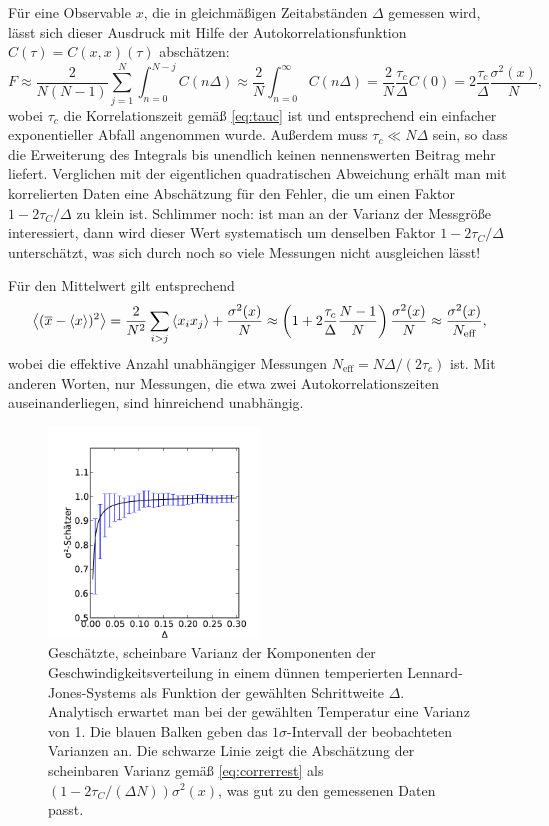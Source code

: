 Für eine Observable $x$, die in gleichmäßigen Zeitabständen $\Delta$
gemessen wird, lässt sich dieser Ausdruck mit Hilfe der
Autokorrelationsfunktion $C(\tau) = C(x,x)(\tau)$ abschätzen:
\begin{equation}
  \label{eq:correrrest}
  F
  \approx
  \frac{2}{N(N-1)}\sum_{j=1}^{N}\int_{n = 0}^{N-j} C(n\Delta)
  \approx
  \frac{2}{N}\int_{n = 0}^{\infty} C(n\Delta)
  =
  \frac{2}{N}\frac{\tau_c}{\Delta} C(0)
  =
  2\frac{\tau_c}{\Delta}\frac{\sigma^2(x)}{N},
\end{equation}
wobei $\tau_c$ die Korrelationszeit gemäß \eqref{eq:tauc} ist und
entsprechend ein einfacher exponentieller Abfall angenommen
wurde. Außerdem muss $\tau_c\ll N\Delta$ sein, so dass die Erweiterung
des Integrals bis unendlich keinen nennenswerten Beitrag mehr liefert.
Verglichen mit der eigentlichen quadratischen Abweichung erhält man
mit korrelierten Daten eine Abschätzung für den Fehler, die um einen
Faktor $1-2\tau_C/\Delta$ zu klein ist. Schlimmer noch: ist man an der
Varianz der Messgröße interessiert, dann wird dieser Wert systematisch
um denselben Faktor $1-2\tau_C/\Delta$ unterschätzt, was sich durch
noch so viele Messungen nicht ausgleichen lässt!

Für den Mittelwert gilt entsprechend
\begin{align}
  \left\langle{(\overline{x} - \left\langle{x}\right\rangle)^2}\right\rangle
  = \frac{2}{N^2}\sum_{i > j} \left\langle{x_ix_j}\right\rangle
  + \frac{\sigma^2(x)}{N} \approx
  \left(1+2\frac{\tau_c}{\Delta}\frac{N-1}{N}\right)\frac{\sigma^2(x)}{N}
  \approx \frac{\sigma^2(x)}{N_\text{eff}},
\end{align}
wobei die effektive Anzahl unabhängiger Messungen
$N_\text{eff} = N \Delta / (2\tau_c)$ ist. Mit anderen Worten,
nur Messungen, die etwa zwei Autokorrelationszeiten auseinanderliegen,
sind hinreichend unabhängig.

\begin{figure}
  \centering
  \includegraphics[width=0.5\textwidth]{plots/error}
  \caption{Geschätzte, scheinbare Varianz der Komponenten der
    Geschwindigkeitsverteilung in einem dünnen temperierten
    Lennard-Jones-Systems als Funktion der gewählten Schrittweite
    $\Delta$. Analytisch erwartet man bei der gewählten Temperatur
    eine Varianz von 1. Die blauen Balken geben das
    $1\sigma$-Intervall der beobachteten Varianzen an. Die schwarze
    Linie zeigt die Abschätzung der scheinbaren Varianz gemäß
    \eqref{eq:correrrest} als $(1-2\tau_C/(\Delta N))\sigma^2(x)$, was
    gut zu den gemessenen Daten passt.}
  \label{fig:error}
\end{figure}

